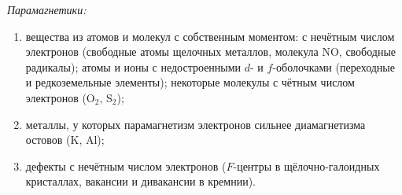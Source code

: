 \emph{Парамагнетики:}
\begin{enumerate}
\item вещества из атомов и молекул с собственным моментом: с нечётным
числом электронов (свободные атомы щелочных металлов, молекула NO,
свободные радикалы); атомы и ионы с недостроенными $d$- и
$f$-оболочками (переходные и редкоземельные элементы); некоторые
молекулы с чётным числом электронов (O$_2$, S$_2$);
\item металлы, у которых парамагнетизм электронов сильнее диамагнетизма
остовов (K, Al);
\item дефекты с нечётным числом электронов ($F$-центры в
щёлочно-галоидных кристаллах, вакансии и дивакансии в кремнии).
\end{enumerate}
